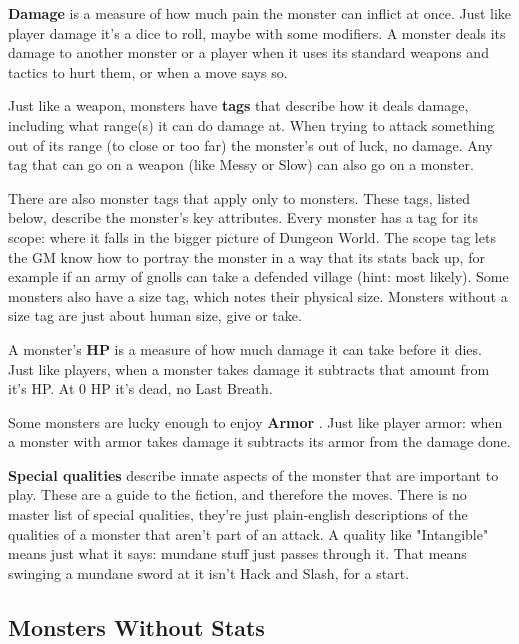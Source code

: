  

{\bf Damage}  is a measure of how much pain the monster can inflict at once. Just like player damage it's a dice to roll, maybe with some modifiers. A monster deals its damage to another monster or a player when it uses its standard weapons and tactics to hurt them, or when a move says so.

 

Just like a weapon, monsters have {\bf tags}  that describe how it deals damage, including what range(s) it can do damage at. When trying to attack something out of its range (to close or too far) the monster's out of luck, no damage. Any tag that can go on a weapon (like Messy or Slow) can also go on a monster.

 

There are also monster tags that apply only to monsters. These tags, listed below, describe the monster's key attributes. Every monster has a tag for its scope: where it falls in the bigger picture of Dungeon World. The scope tag lets the GM know how to portray the monster in a way that its stats back up, for example if an army of gnolls can take a defended village (hint: most likely). Some monsters also have a size tag, which notes their physical size. Monsters without a size tag are just about human size, give or take.

 

A monster's {\bf HP}  is a measure of how much damage it can take before it dies. Just like players, when a monster takes damage it subtracts that amount from it's HP. At 0 HP it's dead, no Last Breath.

 

Some monsters are lucky enough to enjoy {\bf Armor} . Just like player armor: when a monster with armor takes damage it subtracts its armor from the damage done.

 

{\bf Special qualities}  describe innate aspects of the monster that are important to play. These are a guide to the fiction, and therefore the moves. There is no master list of special qualities, they're just plain-english descriptions of the qualities of a monster that aren't part of an attack. A quality like "Intangible" means just what it says: mundane stuff just passes through it. That means swinging a mundane sword at it isn't Hack and Slash, for a start.

 
\subsection{Monsters Without Stats}    
 


